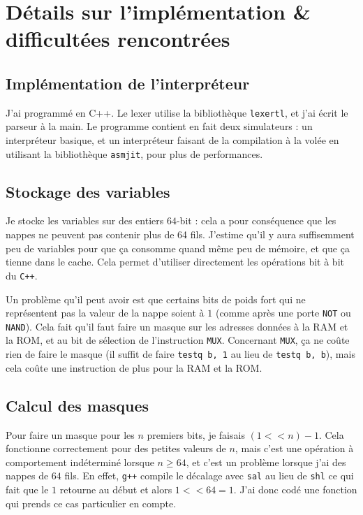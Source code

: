 \documentclass[12pt]{article}
\begin{document}
\section{Détails sur l'implémentation \& difficultées rencontrées}

\subsection{Implémentation de l'interpréteur}

J'ai programmé en C++. Le lexer utilise la bibliothèque \verb$lexertl$, et j'ai écrit le parseur à la main.
Le programme contient en fait deux simulateurs : un interpréteur basique, et un interpréteur faisant de la compilation à la volée en utilisant la bibliothèque \verb$asmjit$, pour plus de performances.

\subsection{Stockage des variables}

Je stocke les variables sur des entiers $64$-bit : cela a pour conséquence que les nappes ne peuvent pas contenir plus de 64 fils.
J'estime qu'il y aura suffisemment peu de variables pour que ça consomme quand même peu de mémoire, et que ça tienne dans le cache.
Cela permet d'utiliser directement les opérations bit à bit du \verb$C++$.

Un problème qu'il peut avoir est que certains bits de poids fort qui ne représentent pas la valeur de la nappe soient à $1$ (comme après une porte \verb$NOT$ ou \verb$NAND$).
Cela fait qu'il faut faire un masque sur les adresses données à la RAM et la ROM, et au bit de sélection de l'instruction \verb$MUX$.
Concernant \verb$MUX$, ça ne coûte rien de faire le masque (il suffit de faire \verb$testq b, 1$ au lieu de \verb$testq b, b$), mais cela coûte une instruction de plus pour la RAM et la ROM.

\subsection{Calcul des masques}

Pour faire un masque pour les $n$ premiers bits, je faisais $(1<<n)-1$.
Cela fonctionne correctement pour des petites valeurs de $n$, mais c'est une opération à comportement indéterminé lorsque $n \geq 64$, et c'est un problème lorsque j'ai des nappes de $64$ fils.
En effet, \verb$g++$ compile le décalage avec \verb$sal$ au lieu de \verb$shl$ ce qui fait que le $1$ retourne au début et alors $1<<64 = 1$. J'ai donc codé une fonction qui prends ce cas particulier en compte.
\end{document}
